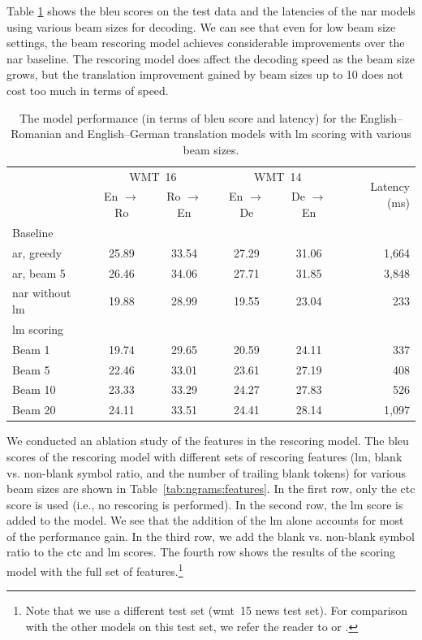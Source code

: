 Table \ref{tab:ngrams:bleu} shows the \acs{bleu} scores on the test data and
the latencies of the \ac{nar} models using various beam sizes for decoding. We
can see that even for low beam size settings, the beam rescoring model
achieves considerable improvements over the \ac{nar} baseline. The rescoring
model does affect the decoding speed as the beam size grows, but the
translation improvement gained by beam sizes up to 10 does not cost too much in
terms of speed.

\begin{table}
  \centering

  \begin{tabular}{lccccr}
    \toprule
    & \multicolumn{2}{c}{WMT~16}
    & \multicolumn{2}{c}{WMT~14}
    & \multirow{2}{*}{Latency (ms)} \\
    & En $\rightarrow$ Ro & Ro $\rightarrow$ En
    & En $\rightarrow$ De & De $\rightarrow$ En  & \\
    \midrule
    Baseline & & & & & \\
    \acs{ar}, greedy & 25.89 & 33.54 & 27.29 &  31.06 & 1,664 \\
    \acs{ar}, beam 5 & 26.46 & 34.06 & 27.71 & 31.85 & 3,848 \\
    \acs{nar} without \acs{lm} & 19.88 & 28.99 & 19.55 & 23.04 & 233 \\
    \addlinespace
    \acs{lm} scoring & & & & & \\
    Beam 1 & 19.74 & 29.65 & 20.59 & 24.11 &  337 \\
    Beam 5 & 22.46 & 33.01 & 23.61 & 27.19 & 408  \\
    Beam 10 & 23.33 & 33.29 & 24.27 & 27.83 & 526 \\
    Beam 20 & 24.11 & 33.51 & 24.41 & 28.14 & 1,097 \\
    \bottomrule
  \end{tabular}

  \caption{The model performance (in terms of \acs{bleu} score and latency) for
    the English--Romanian and English--German translation models with \acs{lm}
    scoring with various beam sizes.}%
  \label{tab:ngrams:bleu}
\end{table}

We conducted an ablation study of the features in the rescoring model. The
\acs{bleu} scores of the rescoring model with different sets of rescoring
features (\ac{lm}, blank vs. non-blank symbol ratio, and the number of trailing
blank tokens) for various beam sizes are shown in
Table~\ref{tab:ngrams:features}. In the first row, only the \ac{ctc} score is
used (i.e., no rescoring is performed). In the second row, the \ac{lm} score is
added to the model. We see that the addition of the \ac{lm} alone accounts for
most of the performance gain. In the third row, we add the blank vs. non-blank
symbol ratio to the \ac{ctc} and \ac{lm} scores. The fourth row shows the
results of the scoring model with the full set of features.\footnote{Note that
  we use a different test set (\ac{wmt}~15 news test set). For comparison with
  the other models on this test set, we refer the reader to
  \citet{kasner2020improving} or \citet{kasner2020incorporating}.}

